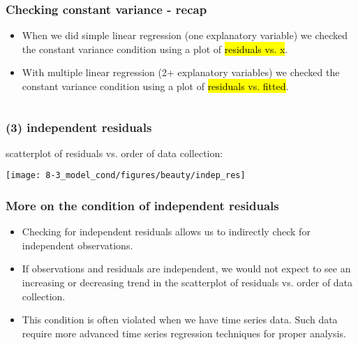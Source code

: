 
\begin{frame}
\frametitle{Checking constant variance - recap}

\begin{itemize}

\item When we did simple linear regression (one explanatory variable) we checked the constant variance condition using a plot of \hl{residuals vs. x}.

\item With multiple linear regression (2+ explanatory variables) we checked the constant variance condition using a plot of \hl{residuals vs. fitted}. 

\end{itemize}

$\:$ \\



\end{frame}


\begin{frame}[fragile]
\frametitle{(3) independent residuals}

scatterplot of residuals vs. order of data collection: \\

\begin{center}
\texttt{[image: 8-3\_model\_cond/figures/beauty/indep\_res]}
\end{center}


\end{frame}


\begin{frame}
\frametitle{More on the condition of independent residuals}

\begin{itemize}

\item Checking for independent residuals allows us to indirectly check for independent observations.

\item If observations and residuals are independent, we would not expect to see an increasing or decreasing trend in the scatterplot of residuals vs. order of data collection.

\item This condition is often violated when we have time series data. Such data require more advanced time series regression techniques for proper analysis.

\end{itemize}

\end{frame}

